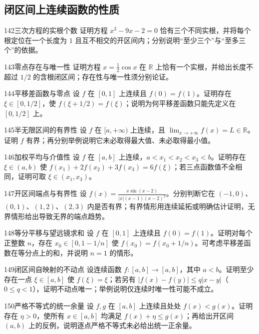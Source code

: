 \subsection{闭区间上连续函数的性质}
\begin{exercise}{142}{三次方程的实根个数}
证明方程 $x^3-9x-2=0$ 恰有三个不同实根，并将每个根定位在一个长度为 $1$ 且互不相交的开区间内；分别说明“至少三个”与“至多三个”的依据。
\end{exercise}
\begin{exercise}{143}{零点存在与唯一性}
证明方程 $x=\frac12\cos x$ 在 $\mathbb R$ 上恰有一个实根，并给出长度不超过 $1/2$ 的含根闭区间；存在性与唯一性须分别论证。
\end{exercise}
\begin{exercise}{144}{平移差函数与零点}
设 $f$ 在 $[0,1]$ 上连续且 $f(0)=f(1)$。证明存在 $\xi\in[0,1/2]$，使 $f(\xi+1/2)=f(\xi)$；说明为何平移差函数只能先定义在 $[0,1/2]$ 上。
\end{exercise}
\begin{exercise}{145}{半无限区间的有界性}
设 $f$ 在 $[a,+\infty)$ 上连续，且 $\lim_{x\to+\infty}f(x)=L\in\mathbb R$。证明 $f$ 有界；再分别举例说明它未必取得最大值、未必取得最小值。
\end{exercise}
\begin{exercise}{146}{加权平均与介值性}
设 $f$ 在 $[a,b]$ 上连续，$a<x_1<x_2<x_3<b$。证明存在 $\xi\in(a,b)$ 使 $f(x_1)+2f(x_2)+3f(x_3)=6f(\xi)$；若三点函数值不全相同，证明可取 $\xi\in(x_1,x_3)$。
\end{exercise}
\begin{exercise}{147}{开区间端点与有界性}
设 $f(x)=\frac{x\sin(x-2)}{|x|(x-1)(x-2)^2}$。分别判断它在 $(-1,0)$、$(0,1)$、$(1,2)$、$(2,3)$ 内是否有界；有界情形用连续延拓或明确估计证明，无界情形给出导致无界的端点趋势。
\end{exercise}
\begin{exercise}{148}{等分平移与望远镜求和}
设 $f$ 在 $[0,1]$ 上连续且 $f(0)=f(1)$。证明对每个正整数 $n$，存在 $x_0\in[0,1-1/n]$ 使 $f(x_0)=f(x_0+1/n)$。可考虑平移差函数在等分点上的和，并说明 $n=1$ 的情形。
\end{exercise}
\begin{exercise}{149}{闭区间自映射的不动点}
设连续函数 $f:[a,b]\to[a,b]$，其中 $a<b$。证明至少存在一点 $\xi\in[a,b]$ 使 $f(\xi)=\xi$；若另有 $|f(x)-f(y)|\le q|x-y|$（$0\le q<1$），证明不动点唯一；举例说明仅连续时唯一性可能不成立。
\end{exercise}
\begin{exercise}{150}{严格不等式的统一余量}
设 $f,g$ 在 $[a,b]$ 上连续且处处 $f(x)<g(x)$。证明存在 $\eta>0$，使所有 $x\in[a,b]$ 均满足 $f(x)+\eta\le g(x)$；再给出开区间 $(a,b)$ 上的反例，说明逐点严格不等式未必给出统一正余量。
\end{exercise}
